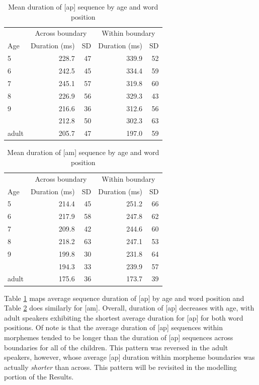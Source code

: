 \documentclass[a4paper,man,floatsintext,natbib,donotrepeattitle, apacite]{apa6}
\begin{document}
\begin{table}[H]

\caption{\label{tab:ap-dur-tbl}Mean duration of [ap] sequence by age and word position}
\centering
\begin{tabular}[t]{lrrrr}
\toprule
\multicolumn{1}{c}{ } & \multicolumn{2}{c}{Across boundary} & \multicolumn{2}{c}{Within boundary} \\
\cmidrule(l{3pt}r{3pt}){2-3} \cmidrule(l{3pt}r{3pt}){4-5}
Age & Duration (ms) & SD  & Duration (ms) & SD\\
\midrule
5 & 228.7 & 47 & 339.9 & 52\\
6 & 242.5 & 45 & 334.4 & 59\\
7 & 245.1 & 57 & 319.8 & 60\\
8 & 226.9 & 56 & 329.3 & 43\\
9 & 216.6 & 36 & 312.6 & 56\\
\addlinespace
10 & 212.8 & 50 & 302.3 & 63\\
adult & 205.7 & 47 & 197.0 & 59\\
\bottomrule
\end{tabular}
\end{table}

\begin{table}[H]

\caption{\label{tab:am-dur-tbl}Mean duration of [am] sequence by age and word position}
\centering
\begin{tabular}[t]{lrrrr}
\toprule
\multicolumn{1}{c}{ } & \multicolumn{2}{c}{Across boundary} & \multicolumn{2}{c}{Within boundary} \\
\cmidrule(l{3pt}r{3pt}){2-3} \cmidrule(l{3pt}r{3pt}){4-5}
Age & Duration (ms) & SD  & Duration (ms) & SD\\
\midrule
5 & 214.4 & 45 & 251.2 & 66\\
6 & 217.9 & 58 & 247.8 & 62\\
7 & 209.8 & 42 & 244.6 & 60\\
8 & 218.2 & 63 & 247.1 & 53\\
9 & 199.8 & 30 & 231.8 & 64\\
\addlinespace
10 & 194.3 & 33 & 239.9 & 57\\
adult & 175.6 & 36 & 173.7 & 39\\
\bottomrule
\end{tabular}
\end{table}

Table \ref{tab:ap-dur-tbl} maps average sequence duration of {[}ap{]} by age and word position and Table \ref{tab:am-dur-tbl} does similarly for {[}am{]}. Overall, duration of {[}ap{]} decreases with age, with adult speakers exhibiting the shortest average duration for {[}ap{]} for both word positions. Of note is that the average duration of {[}ap{]} sequences within morphemes tended to be longer than the duration of {[}ap{]} sequences across boundaries for all of the children. This pattern was reversed in the adult speakers, however, whose average {[}ap{]} duration within morpheme boundaries was actually \emph{shorter} than across. This pattern will be revisited in the modelling portion of the Results.
\end{document}
